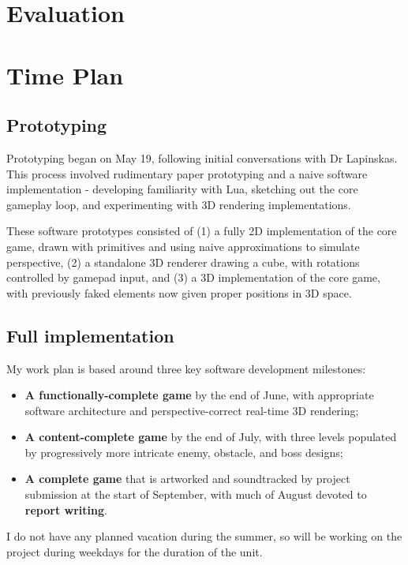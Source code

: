 \documentclass{article}
\begin{document}
\section{Evaluation}

\section{Time Plan}
\subsection*{Prototyping}
Prototyping began on May 19, following initial conversations with Dr Lapinskas. This process involved
rudimentary paper prototyping and a naive software implementation - developing familiarity with Lua,
sketching out the core gameplay loop, and experimenting with 3D rendering implementations. 

These software prototypes consisted of (1) a fully 2D implementation of the core game,
drawn with primitives and using naive approximations to simulate perspective,
(2) a standalone 3D renderer drawing a cube, with rotations controlled by gamepad input,
and (3) a 3D implementation of the core game, with previously faked elements
now given proper positions in 3D space.

\subsection*{Full implementation}
My work plan is based around three key software development milestones:
\begin{itemize}
    \item \textbf{A functionally-complete game} by the end of June,
    with appropriate software architecture\cite{nystrom}
    and perspective-correct real-time 3D rendering\cite{gambetta};
    \item \textbf{A content-complete game} by the end of July,
    with three levels populated by progressively more intricate enemy, obstacle, and boss designs;
    \item \textbf{A complete game} that is artworked and soundtracked
    by project submission at the start of September, with much of August devoted to
    \textbf{report writing}.
\end{itemize}
I do not have any planned vacation during the summer, so will be working on the
project during weekdays for the duration of the unit.

\printbibliography
\end{document}
